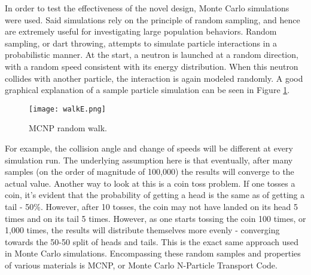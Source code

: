 In order to test the effectiveness of the novel design, Monte Carlo simulations were used. Said simulations rely on the principle of random sampling, and hence are extremely useful for investigating large population behaviors. Random sampling, or dart throwing, attempts to simulate particle interactions in a probabilistic manner. At the start, a neutron is launched at a random direction, with a random speed consistent with its energy distribution. When this neutron collides with another particle, the interaction is again modeled randomly. A good graphical explanation of a sample particle simulation can be seen in Figure \ref{fig:randomwalk}.
\begin{figure}[!htbp]
\centering
\texttt{[image: walkE.png]}
\caption{MCNP random walk.}
\label{fig:randomwalk}
\end{figure}
For example, the collision angle and change of speeds will be different at every simulation run. The underlying assumption here is that eventually, after many samples (on the order of magnitude of 100,000) the results will converge to the actual value. Another way to look at this is a coin toss problem. If one tosses a coin, it's evident that the probability of getting a head is the same as of getting a tail - 50\%. However, after 10 tosses, the coin may not have landed on its head 5 times and on its tail 5 times. However, as one starts tossing the coin 100 times, or 1,000 times, the results will distribute themselves more evenly - converging towards the 50-50 split of heads and tails. This is the exact same approach used in Monte Carlo simulations. Encompassing these random samples and properties of various materials is MCNP, or Monte Carlo N-Particle Transport Code.


